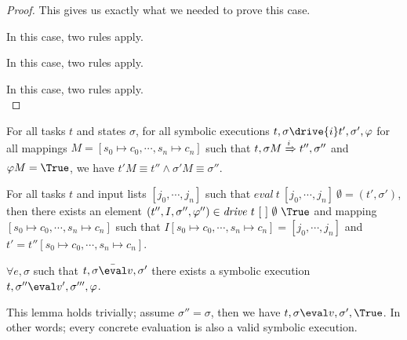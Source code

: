 \begin{proof}
{{      This gives us exactly what we needed to prove this case.

      }
  }

  {

  }

  {
  In this case, two rules apply.\\
  }

  {
  In this case, two rules apply.\\
  }

  {
  In this case, two rules apply.\\
  }
\end{proof}

\begin{lemma}
  \label{lem:sounddrive}

  For all tasks $t$ and states $\sigma$,
  for all symbolic executions $t,\sigma\drive{i} t',\sigma',\phi$
  for all mappings $M=[s_0\mapsto c_0,\cdots,s_n\mapsto c_n]$
  such that $t,\sigma M \xRightarrow[]{i} t'',\sigma''$ and $\phi M = \True$,
  we have $t'M \equiv t'' \wedge \sigma' M \equiv \sigma''$.
\end{lemma}


\begin{theorem}
For all tasks $t$ and input lists $[j_0,\cdots,j_n]$ such that $\mathit{eval}\ t\ [j_0,\cdots,j_n]\ \emptyset = (t',\sigma')$,
then there exists an element $(t'',I,\sigma'',\phi'')\in \mathit{drive}\ t\ [\ ]\ \emptyset\ \True$ and mapping $[s_0\mapsto c_0,\cdots,s_n\mapsto c_n]$ such that
$I[s_0\mapsto c_0,\cdots,s_n\mapsto c_n]=[j_0,\cdots,j_n]$ and $t'=t''[s_0\mapsto c_0,\cdots,s_n\mapsto c_n]$.
  \label{thm:complete}
\end{theorem}


\begin{lemma}
  $\forall e,\sigma$ such that $t,\sigma \bar{\eval}v,\sigma'$
  there exists a symbolic execution $t,\sigma''\eval v',\sigma''',\phi$.
\end{lemma}

This lemma holds trivially; assume $\sigma''=\sigma$, then we have $t,\sigma\eval v,\sigma',\True$. In other words; every concrete evaluation is also a valid symbolic execution.

